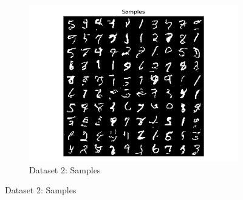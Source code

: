\documentclass{article}
\begin{document}
\begin{enumerate}[(a)]
\begin{figure}[H]
    \begin{subfigure}{0.45\textwidth}
        \centering
        \includegraphics[width=\textwidth]{figures/q2_a_dset2_samples.png}
        \caption{Dataset 2: Samples}
    \end{subfigure}
\end{figure}

\newpage


\end{enumerate}
\end{document}
